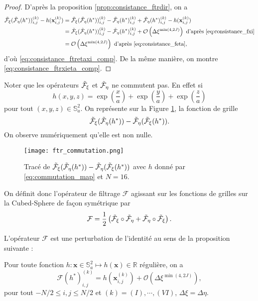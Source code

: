 \begin{proof}
D'après la proposition \ref{prop:consistance_ftrdir}, on a
\begin{align*}
\tilde{\mathcal{F}}_{\xi}(\tilde{\mathcal{F}}_{\eta} (h^*) )_{i,j}^{(k)} - h(\mathbf{x}_{i,j}^{(k)}) & = \tilde{\mathcal{F}}_{\xi}(\tilde{\mathcal{F}}_{\eta} (h^*) )_{i,j}^{(k)} - \tilde{\mathcal{F}}_{\eta}(h^*)_{i,j}^{(k)} + \tilde{\mathcal{F}}_{\eta}(h^*)_{i,j}^{(k)} - h(\mathbf{x}_{i,j}^{(k)})\\
	& = \tilde{\mathcal{F}}_{\xi}(\tilde{\mathcal{F}}_{\eta} (h^*) )_{i,j}^{(k)} - \tilde{\mathcal{F}}_{\eta}(h^*)_{i,j}^{(k)} + \mathcal{O} \left( \Delta \xi^{\min(4,2J)} \right) \text{ d'après \eqref{eq:consistance_fxi}}\\
	& = \mathcal{O} \left( \Delta \xi^{\min(4,2J)} \right) \text{ d'après \eqref{eq:consistance_feta}},
\end{align*}
d'où \eqref{eq:consistance_ftretaxi_comp}.
De la même manière, on montre \eqref{eq:consistance_ftrxieta_comp}.
\end{proof}

Noter que les opérateurs $\tilde{\mathcal{F}}_{\xi}$ et $\tilde{\mathcal{F}}_{\eta}$ ne commutent pas. En effet si 
\begin{equation}
h(x,y,z) = \exp \left( \dfrac{x}{a} \right) + \exp \left( \dfrac{y}{a} \right) + \exp \left( \dfrac{z}{a} \right)
\label{eq:commutation_map}
\end{equation}
pour tout $(x,y,z) \in \mathbb{S}_a^2$. On représente sur la Figure \ref{fig:commutation_map}, la fonction de grille
\begin{equation}
\tilde{\mathcal{F}}_{\xi} (\tilde{\mathcal{F}}_{\eta}(h^*))-\tilde{\mathcal{F}}_{\eta} (\tilde{\mathcal{F}}_{\xi}(h^*)).
\end{equation}
On observe numériquement qu'elle est non nulle.
\begin{figure}[htbp]
\begin{center}
\texttt{[image: ftr\_commutation.png]}
\end{center}
\caption{Tracé de $\tilde{\mathcal{F}}_{\xi} (\tilde{\mathcal{F}}_{\eta}(h^*))-\tilde{\mathcal{F}}_{\eta} (\tilde{\mathcal{F}}_{\xi} (h^*))$ avec $h$ donné par \eqref{eq:commutation_map} et $N=16$.}
\label{fig:commutation_map}
\end{figure}
On définit donc l'opérateur de filtrage $\mathcal{F}$ agissant sur les fonctions de grilles sur la Cubed-Sphere de façon symétrique par
\begin{equation}
\mathcal{F} = \dfrac{1}{2} \left( \tilde{\mathcal{F}}_{\xi} \circ \tilde{\mathcal{F}}_{\eta} + \tilde{\mathcal{F}}_{\eta} \circ \tilde{\mathcal{F}}_{\xi} \right).
\label{eq:operateur_filtrage}
\end{equation}

L'opérateur $\mathcal{F}$ est une perturbation de l'identité au sens de la proposition suivante :
\begin{proposition}
Pour toute fonction $h : \mathbf{x} \in \mathbb{S}_a^2 \mapsto h(\mathbf{x}) \in \mathbb{R}$ régulière, on a 
\begin{equation}
\mathcal{F}(h^*)_{i,j}^{(k)} = h(\mathbf{x}_{i,j}^{(k)}) + \mathcal{O}\left( \Delta \xi^{\min(4,2J)} \right),
\label{eq:operteur_filtrage_cons}
\end{equation}
pour tout $-N/2 \leq i,j \leq N/2$ et $(k) = (I), \cdots , (VI)$, $\Delta \xi = \Delta \eta$.
\end{proposition}

